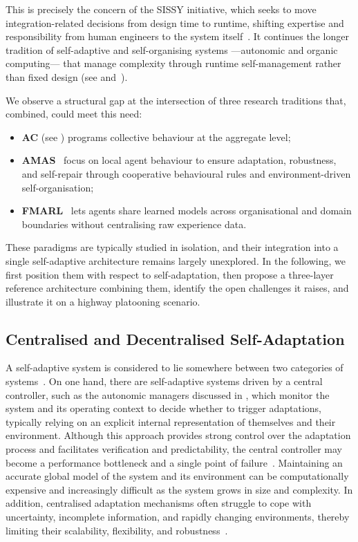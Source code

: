 This is precisely the concern of the \ac{SISSY} initiative,
which seeks to move integration-related decisions
from
design time to runtime,
shifting expertise and responsibility
from
human engineers to the system itself~\cite{bellman2021self}.
%
It continues the longer tradition of
self-adaptive and self-organising systems%
---autonomic and organic computing---%
that
manage complexity through runtime self-management
rather than
fixed design (see  and~\cite{muller2017organic}).

We observe a structural gap at
the intersection of three research traditions that,
combined, could meet this need:
\begin{itemize}
    \item \textbf{\ac{AC}} (see )
    programs collective behaviour at the aggregate level;

    \item \textbf{\acf{AMAS}}~\cite{gleizes2007engineering}
    focus on local agent behaviour to ensure
    adaptation, robustness, and self-repair
    through cooperative behavioural rules
    and environment-driven self-organisation;

    \item \textbf{\acf{FMARL}}~\cite{jing2025federated}
    lets agents share learned models across organisational
    and domain boundaries without centralising raw experience data.
\end{itemize}
%
These paradigms are typically studied in isolation,
and
their integration into a single self-adaptive architecture
remains largely unexplored.
%
In the following,
we first position them with respect to self-adaptation,
then propose a three-layer reference architecture combining them,
identify the open challenges it raises,
and illustrate it on a highway platooning scenario.

\subsection{Centralised and Decentralised Self-Adaptation}
\label{sec:perspectives-sissy-background}

A self-adaptive system is considered to lie somewhere
between two categories of systems~\cite{delemos2013swese}.
%
On one hand,
there are self-adaptive systems driven by a central controller,
such as the autonomic managers discussed in ,
which monitor the system and its operating context
to decide whether to trigger adaptations,
typically relying on an explicit internal representation
of themselves and their environment.
%
Although
this approach provides
strong control over the adaptation process
and
facilitates verification and predictability,
the central controller may become a performance bottleneck
and
a single point of failure~\cite{lange2025measurement}.
%
Maintaining an accurate global model of
the system and its environment
can be computationally expensive
and
increasingly difficult as the system grows in size and complexity.
%
In addition,
centralised adaptation mechanisms
often struggle to cope with
uncertainty, incomplete information, and rapidly changing environments,
thereby
limiting their scalability, flexibility, and robustness~\cite{al2026collaborative}.

